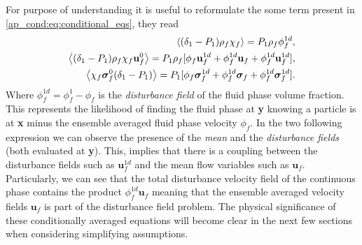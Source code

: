 For purpose of understanding it is useful to reformulate the some term present in \ref{ap_cond:eq:conditional_eqs}, they read
\begin{align*}
    \left<(\delta_1 - P_1)\rho_f\chi_f\right>
    = P_1 \rho_f  \phi_f^{1d},\\ 
    \left<(\delta_1 - P_1)\rho_f\chi_f\textbf{u}^0_f\right>
    = P_1 \rho_f [
        \phi_f \textbf{u}_f^{1d}
        + \phi_f^{1d} \textbf{u}_f
        + \phi_f^{1d} \textbf{u}_f^{1d}
    ],\\
    \left<\chi_f \bm\sigma^0_f(\delta_1 - P_1)\right> 
    = 
    P_1[\phi_f      \bm\sigma^{1d}_f 
    + \phi_f^{1d} \bm\sigma_f
    + \phi_f^{1d} \bm\sigma_f^{1d} ]. 
\end{align*}
Where $\phi_f^{1d} = \phi_f^1 - \phi_f$ is the \textit{disturbance field} of the fluid phase volume fraction. 
This represents the likelihood of finding the fluid phase at \textbf{y} knowing a particle is at \textbf{x} minus the ensemble averaged fluid phase velocity $\phi_f$. 
In the two following expression we can observe the presence of the \textit{mean} and the \textit{disturbance fields} (both evaluated at \textbf{y}). 
This, implies that there is a coupling between the disturbance fields such as $\textbf{u}_f^{1d}$ and the mean flow variables such as $\textbf{u}_f$.
Particularly, we can see that the total disturbance velocity field of the continuous phase contains the product $\phi_f^{1d} \textbf{u}_f$ meaning that the ensemble averaged velocity fields $\textbf{u}_f$ is part of the disturbance field problem. 
The physical significance of these conditionally averaged equations will become clear in the next few sections when considering simplifying assumptions. 

